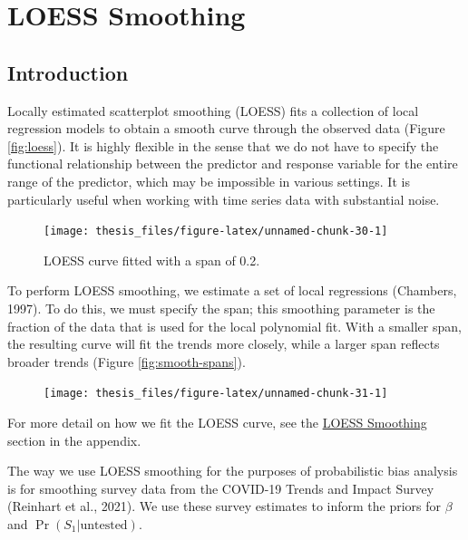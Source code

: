 \documentclass[12pt,twoside]{smiththesis}
\begin{document}
\hypertarget{loess-smoothing}{%
\section{LOESS Smoothing}\label{loess-smoothing}}

\hypertarget{introduction-1}{%
\subsection{Introduction}\label{introduction-1}}

Locally estimated scatterplot smoothing (LOESS) fits a collection of local regression models to obtain a smooth curve through the observed data (Figure \ref{fig:loess}). It is highly flexible in the sense that we do not have to specify the functional relationship between the predictor and response variable for the entire range of the predictor, which may be impossible in various settings. It is particularly useful when working with time series data with substantial noise.
\begin{figure}

{\centering \texttt{[image: thesis\_files/figure-latex/unnamed-chunk-30-1]} 

}

\caption{\label{fig:loess}LOESS curve fitted with  a span of 0.2. }\label{fig:unnamed-chunk-30}
\end{figure}
To perform LOESS smoothing, we estimate a set of local regressions (Chambers, 1997). To do this, we must specify the span; this smoothing parameter is the fraction of the data that is used for the local polynomial fit. With a smaller span, the resulting curve will fit the trends more closely, while a larger span reflects broader trends (Figure \ref{fig:smooth-spans}).
\begin{figure}

{\centering \texttt{[image: thesis\_files/figure-latex/unnamed-chunk-31-1]} 

}

\caption{\label{fig:smooth-spans}}\label{fig:unnamed-chunk-31}
\end{figure}
For more detail on how we fit the LOESS curve, see the \protect\hyperlink{loess}{LOESS Smoothing} section in the appendix.

The way we use LOESS smoothing for the purposes of probabilistic bias analysis is for smoothing survey data from the COVID-19 Trends and Impact Survey (Reinhart et al., 2021). We use these survey estimates to inform the priors for \(\beta\) and \(\Pr(S_1|\text{untested})\).
\end{document}

